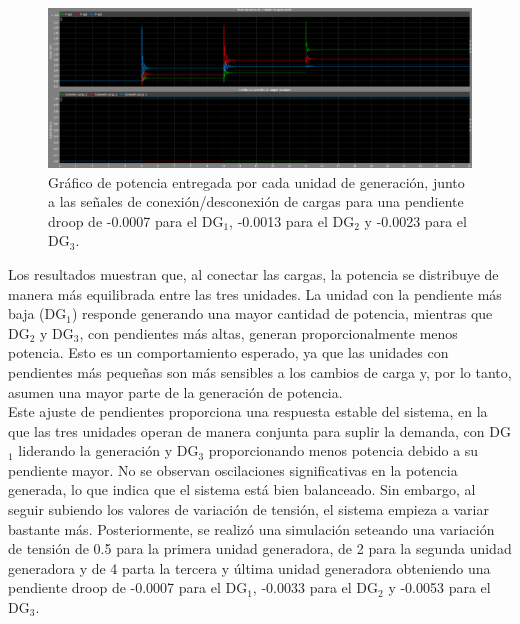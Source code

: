 \begin{figure}
    \centering
    \includegraphics[width=1.0\linewidth]{Tarea 2/report/imagenes/p1b/mp_dist_ok.png}
    \caption{Gráfico de potencia entregada por cada unidad de generación, junto a las señales de conexión/desconexión de cargas para una pendiente droop de -0.0007 para el DG$_1$, -0.0013 para el DG$_2$ y -0.0023 para el DG$_3$.}
    \label{mp_dist_ok}
\end{figure}

Los resultados muestran que, al conectar las cargas, la potencia se distribuye de manera más equilibrada entre las tres unidades. La unidad con la pendiente más baja (DG$_1$) responde generando una mayor cantidad de potencia, mientras que DG$_2$ y DG$_3$, con pendientes más altas, generan proporcionalmente menos potencia. Esto es un comportamiento esperado, ya que las unidades con pendientes más pequeñas son más sensibles a los cambios de carga y, por lo tanto, asumen una mayor parte de la generación de potencia.\\

Este ajuste de pendientes proporciona una respuesta estable del sistema, en la que las tres unidades operan de manera conjunta para suplir la demanda, con DG$_1$ liderando la generación y DG$_3$ proporcionando menos potencia debido a su pendiente mayor. No se observan oscilaciones significativas en la potencia generada, lo que indica que el sistema está bien balanceado. Sin embargo, al seguir subiendo los valores de variación de tensión, el sistema empieza a variar bastante más. Posteriormente, se realizó una simulación seteando una variación de tensión de 0.5 para la primera unidad generadora, de 2 para la segunda unidad generadora y de 4 parta la tercera y última unidad generadora obteniendo una pendiente droop de -0.0007 para el DG$_1$, -0.0033 para el DG$_2$ y -0.0053 para el DG$_3$.

